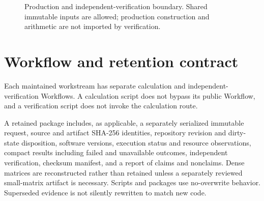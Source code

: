 \documentclass[11pt]{article}
\begin{document}
\begin{figure}[htbp]
  \centering
  \caption{Production and independent-verification boundary.  Shared immutable inputs
  are allowed; production construction and arithmetic are not imported by verification.}
  \label{fig:verification-boundary}
\end{figure}

\section{Workflow and retention contract}

Each maintained workstream has separate calculation and independent-verification
Workflows.  A calculation script does not bypass its public Workflow, and a verification
script does not invoke the calculation route.

A retained package includes, as applicable, a separately serialized immutable request,
source and artifact SHA-256 identities, repository revision and dirty-state disposition,
software versions, execution status and resource observations, compact results including
failed and unavailable outcomes, independent verification, checksum manifest, and a
report of claims and nonclaims.  Dense matrices are reconstructed rather than retained
unless a separately reviewed small-matrix artifact is necessary.  Scripts and packages
use no-overwrite behavior.  Superseded evidence is not silently rewritten to match new
code.
\end{document}

